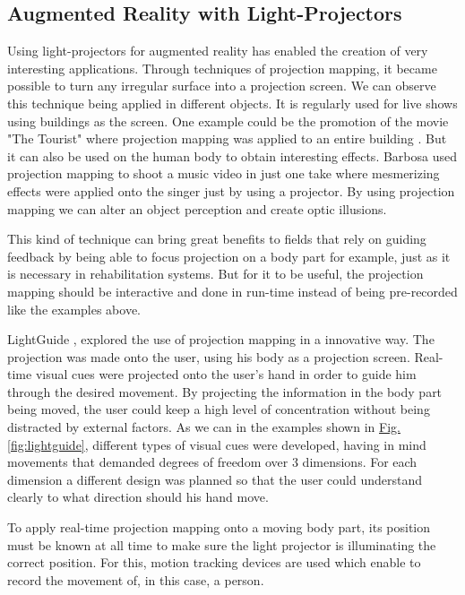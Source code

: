 \subsection{Augmented Reality with Light-Projectors}
\label{RW-projectionmapping}

Using light-projectors for augmented reality has enabled the creation of very interesting applications. 
Through techniques of projection mapping, it became possible to turn any irregular surface into a projection screen.
We can observe this technique being applied in different objects. It is regularly used for live shows 
using buildings as the screen. One example could be the promotion of the movie "The Tourist" where 
projection mapping was applied to an entire building \cite{projectionmapping_building}. But it can 
also be used on the human body to obtain interesting effects. Barbosa \cite{projectionmapping_face} 
used projection mapping to shoot a music video in just one take where mesmerizing effects were applied 
onto the singer just by using a projector. 
By using projection mapping we can alter an object perception and create optic illusions.

This kind of technique can bring great benefits to fields that rely on guiding feedback by being able 
to focus projection on a body part for example, just as it is necessary in rehabilitation systems.
But for it to be useful, the projection mapping should be interactive and done in run-time instead of 
being pre-recorded like the examples above.

LightGuide \cite{Sodhi2012}, explored the use of projection mapping in a innovative way. 
The projection was made onto the user, using his body as a projection screen. 
Real-time visual cues were projected onto the user's hand in order to guide him through the desired movement. 
By projecting the information in the body part being moved, the user could keep a high level of concentration 
without being distracted by external factors.
As we can in the examples shown in \hyperref[fig:lightguide]{Fig. \ref{fig:lightguide}}, different types of visual cues were developed, having in mind movements that demanded degrees of freedom over 3 dimensions. 
For each dimension a different design was planned so that the user could understand clearly to what direction 
should his hand move.

To apply real-time projection mapping onto a moving body part, its 
position must be known at all time to make sure the light projector is 
illuminating the correct position. 
For this, motion tracking devices are used which enable to record the movement of, in this case, a person. 


